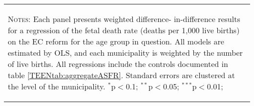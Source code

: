 \begin{table}[htpb!]
\begin{tabular}{@{\extracolsep{5pt}}lccc}
\multicolumn{4}{p{10.2cm}}{\begin{footnotesize}          
\textsc{Notes:} Each panel presents weighted difference-
in-difference results for a regression of the fetal      
death rate (deaths per 1,000 live births) on the EC      
reform for the age group in question. All models are     
estimated by OLS, and each municipality is weighted by   
the number of live births. All regressions include the   
controls documented in table \ref{TEENtab:aggregateASFR}.
Standard errors are clustered at the level of the        
municipality.
$^{*}$p$<$0.1; $^{**}$p$<$0.05; $^{***}$p$<$0.01;\end{footnotesize}}
\normalsize\end{tabular}\end{table}
